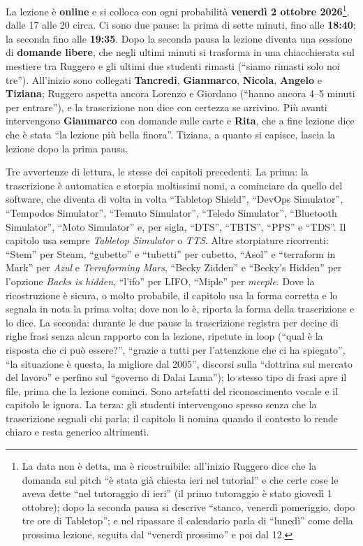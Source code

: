 La lezione è \textbf{online} e si colloca con ogni probabilità \textbf{venerdì 2
ottobre 2026}\footnote{La data non è detta, ma è ricostruibile: all'inizio Ruggero
dice che la domanda sul pitch ``è stata già chiesta ieri nel tutorial'' e che certe
cose le aveva dette ``nel tutoraggio di ieri'' (il primo tutoraggio è stato giovedì 1
ottobre); dopo la seconda pausa si descrive ``stanco, venerdì pomeriggio, dopo tre ore
di Tabletop''; e nel ripassare il calendario parla di ``lunedì'' come della prossima
lezione, seguita dal ``venerdì prossimo'' e poi dal 12.}, dalle 17 alle 20 circa.
Ci sono due pause: la prima di sette minuti, fino alle \textbf{18:40}; la seconda
fino alle \textbf{19:35}. Dopo la seconda pausa la lezione diventa una sessione di
\textbf{domande libere}, che negli ultimi minuti si trasforma in una chiacchierata
sul mestiere tra Ruggero e gli ultimi due studenti rimasti (``siamo rimasti solo noi
tre''). All'inizio sono collegati \textbf{Tancredi}, \textbf{Gianmarco},
\textbf{Nicola}, \textbf{Angelo} e \textbf{Tiziana}; Ruggero aspetta ancora Lorenzo e
Giordano (``hanno ancora 4--5 minuti per entrare''), e la trascrizione non dice con
certezza se arrivino. Più avanti intervengono \textbf{Gianmarco} con domande sulle
carte e \textbf{Rita}, che a fine lezione dice che è stata ``la lezione più bella
finora''. Tiziana, a quanto si capisce, lascia la lezione dopo la prima pausa.

Tre avvertenze di lettura, le stesse dei capitoli precedenti. La prima: la
trascrizione è automatica e storpia moltissimi nomi, a cominciare da quello del
software, che diventa di volta in volta ``Tabletop Shield'', ``DevOps Simulator'',
``Tempodos Simulator'', ``Temuto Simulator'', ``Teledo Simulator'', ``Bluetooth
Simulator'', ``Moto Simulator'' e, per sigla, ``DTS'', ``TBTS'', ``PPS'' e ``TDS''. Il
capitolo usa sempre \emph{Tabletop Simulator} o \emph{TTS}. Altre storpiature
ricorrenti: ``Stem'' per Steam, ``gubetto'' e ``tubetti'' per cubetto, ``Asol'' e
``terraform in Mark'' per \emph{Azul} e \emph{Terraforming Mars}, ``Becky Zidden'' e
``Becky's Hidden'' per l'opzione \emph{Backs is hidden}, ``l'ifo'' per LIFO, ``Miple''
per \emph{meeple}. Dove la ricostruzione è sicura, o molto probabile, il capitolo usa
la forma corretta e lo segnala in nota la prima volta; dove non lo è, riporta la forma
della trascrizione e lo dice. La seconda: durante le due pause la trascrizione
registra per decine di righe frasi senza alcun rapporto con la lezione, ripetute in
loop (``qual è la risposta che ci può essere?'', ``grazie a tutti per l'attenzione che
ci ha spiegato'', ``la situazione è questa, la migliore dal 2005'', discorsi sulla
``dottrina sul mercato del lavoro'' e perfino sul ``governo di Dalai Lama''); lo
stesso tipo di frasi apre il file, prima che la lezione cominci. Sono artefatti del
riconoscimento vocale e il capitolo le ignora. La terza: gli studenti intervengono
spesso senza che la trascrizione segnali chi parla; il capitolo li nomina quando il
contesto lo rende chiaro e resta generico altrimenti.

